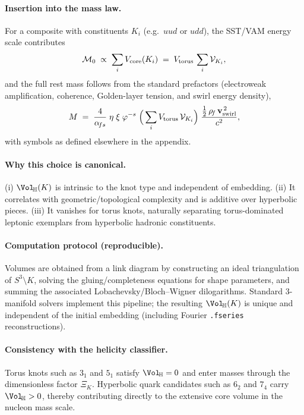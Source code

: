 \paragraph{Insertion into the mass law.}
For a composite with constituents \(K_i\) (e.g.\ \(uud\) or \(udd\)), the SST/VAM energy scale contributes
\[
    \mathcal{M}_0 \;\propto\; \sum_i V_{\text{core}}(K_i)
    \;=\; V_{\rm torus}\,\sum_i \mathcal{V}_{K_i},
\]
and the full rest mass follows from the standard prefactors (electroweak amplification, coherence, Golden-layer tension, and swirl energy density),
\[
    M \;=\; \frac{4}{\alpha_{\!fs}}\;\eta\;\xi\;\varphi^{-s}\;
    \Big(\sum_i V_{\rm torus}\,\mathcal{V}_{K_i}\Big)\;
    \frac{\tfrac12\,\rho_{\!f}\,\mathbf{v}_{\mathrm{swirl}}^{\,2}}{c^2},
\]
with symbols as defined elsewhere in the appendix.

\paragraph{Why this choice is canonical.}
(i) \(\Vol_{\!\mathbb{H}}(K)\) is intrinsic to the knot type and independent of embedding.
(ii) It correlates with geometric/topological complexity and is additive over hyperbolic pieces.
(iii) It vanishes for torus knots, naturally separating torus-dominated leptonic exemplars from hyperbolic hadronic constituents.

\paragraph{Computation protocol (reproducible).}
Volumes are obtained from a link diagram by constructing an ideal triangulation of \(S^3\!\setminus\!K\), solving the gluing/completeness equations for shape parameters, and summing the associated Lobachevsky/Bloch–Wigner dilogarithms. Standard 3-manifold solvers implement this pipeline; the resulting \(\Vol_{\!\mathbb{H}}(K)\) is unique and independent of the initial embedding (including Fourier \texttt{.fseries} reconstructions).

\paragraph{Consistency with the helicity classifier.}
Torus knots such as \(3_1\) and \(5_1\) satisfy \(\Vol_{\!\mathbb{H}}=0\) and enter masses through the dimensionless factor \(\Xi_K\). Hyperbolic quark candidates such as \(6_2\) and \(7_4\) carry \(\Vol_{\!\mathbb{H}}>0\), thereby contributing directly to the extensive core volume in the nucleon mass scale.

